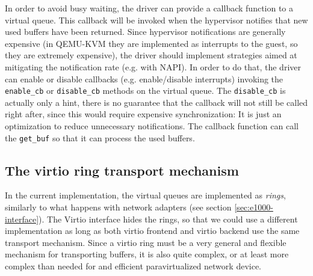 In order to avoid busy waiting, the driver can provide a callback function to a virtual queue. This callback will be invoked when the
hypervisor notifies that new used buffers have been returned. Since hypervisor notifications are generally expensive (in QEMU-KVM they are 
implemented as interrupts to the guest, so they are extremely expensive), the driver should implement strategies aimed at mitigating the
notification rate (e.g. with NAPI). In order to do that, the driver can enable or disable callbacks (e.g. enable/disable interrupts) 
invoking the \texttt{enable\_cb} or \texttt{disable\_cb} methods on the virtual queue. The \texttt{disable\_cb} is actually only a hint,
there is no guarantee that the callback will not still be called right after, since this would require expensive synchronization: It is
just an optimization to reduce unnecessary notifications.
The callback function can call the \texttt{get\_buf} so that it can process the used buffers.


\subsection{The virtio ring transport mechanism}
In the current implementation, the virtual queues are implemented as \emph{rings}, similarly to what happens with network adapters (see
section \ref{sec:e1000-interface}). The Virtio interface hides the rings, so that we could use a different implementation as
long as both virtio frontend and virtio backend use the same transport mechanism.
Since a virtio ring must be a very general and flexible mechanism for transporting buffers, it is also quite complex, or at least more
complex than needed for and efficient paravirtualized network device.

\vspace{0.5cm}

